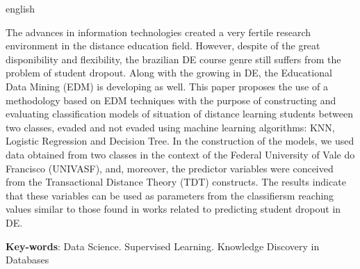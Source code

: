 \begin{resumo}[Abstract]
\begin{otherlanguage*}{english}

  The advances in information technologies created a very fertile research
  environment in the distance education field. However, despite of the great
  disponibility and flexibility, the brazilian DE course genre still suffers
  from the problem of student dropout. Along with the growing in DE, the
  Educational Data Mining (EDM) is developing as well. This paper proposes the
  use of a methodology based on EDM techniques with the purpose of constructing
  and evaluating classification models of situation of distance learning
  students between two classes, evaded and not evaded using machine learning
  algorithms: KNN, Logistic Regression and Decision Tree. In the construction of
  the models, we used data obtained from two classes in the context of the
  Federal University of Vale do Francisco (UNIVASF), and, moreover, the
  predictor variables were conceived from the Transactional Distance Theory
  (TDT) constructs. The results indicate that these variables can be used as
  parameters from the classifiersm reaching values similar to those found in
  works related to predicting student dropout in DE.

  \textbf{Key-words}: Data Science. Supervised Learning. Knowledge Discovery in Databases

\end{otherlanguage*}
\end{resumo}



